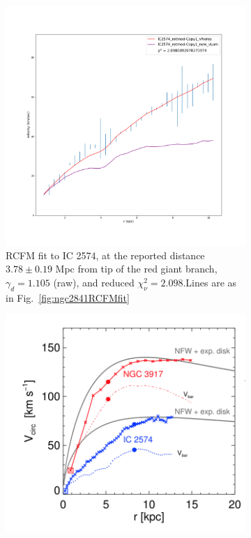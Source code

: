 \documentclass[reprint,%
 amsmath,amssymb,
 aps,
]{revtex4-1}
\begin{document}
 
 \begin{figure}[ht] 
  \begin{subfigure}[b]{0.5\linewidth}
    \centering
    \includegraphics[width=0.95\linewidth]{Updated_Graphs_withnewcolorsandfonts/IC2574_rotmod-Copy1_XueSofue.png} 
    \caption{  RCFM fit to IC 2574, 
      at the reported   distance $3.78 ± 0.19 $ Mpc from tip of the red giant branch, $\gamma_d = 1.105 $ (raw), and reduced $\chi^2_\nu = 2.098  $.Lines are as in Fig.~\ref{fig:ngc2841RCFMfit}
    } 
    \label{fig:IC2574} 
    \vspace{4ex}
  \end{subfigure}%
  \begin{subfigure}[b]{0.5\linewidth}
    \centering
    \includegraphics[width=0.95\linewidth]{figures/Navarro2017Fig3.png} 

\end{subfigure}
\end{figure}
\end{document}
